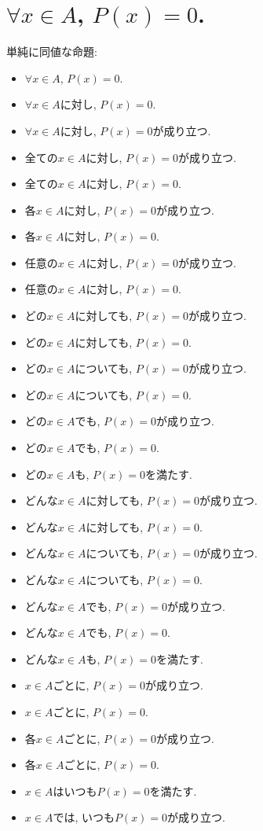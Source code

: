 \documentclass[a4paper,12pt,draft]{amsart}
\begin{document}
\section{$\forall x \in A$, $P(x)=0$.}
単純に同値な命題:
\begin{itemize}
\item $\forall x \in A$, $P(x)=0$.
\item $\forall x \in A$に対し, $P(x)=0$.
\item $\forall x \in A$に対し, $P(x)=0$が成り立つ.
\item 全ての$x\in A$に対し, $P(x)=0$が成り立つ.
\item 全ての$x\in A$に対し, $P(x)=0$.
\item 各$x\in A$に対し, $P(x)=0$が成り立つ.
\item 各$x\in A$に対し, $P(x)=0$.
\item 任意の$x\in A$に対し, $P(x)=0$が成り立つ.
\item 任意の$x\in A$に対し, $P(x)=0$.
\item どの$x\in A$に対しても, $P(x)=0$が成り立つ.
\item どの$x\in A$に対しても, $P(x)=0$.
\item どの$x\in A$についても, $P(x)=0$が成り立つ.
\item どの$x\in A$についても, $P(x)=0$.
\item どの$x\in A$でも, $P(x)=0$が成り立つ.
\item どの$x\in A$でも, $P(x)=0$.
\item どの$x\in A$も, $P(x)=0$を満たす.
\item どんな$x\in A$に対しても, $P(x)=0$が成り立つ.
\item どんな$x\in A$に対しても, $P(x)=0$.
\item どんな$x\in A$についても, $P(x)=0$が成り立つ.
\item どんな$x\in A$についても, $P(x)=0$.
\item どんな$x\in A$でも, $P(x)=0$が成り立つ.
\item どんな$x\in A$でも, $P(x)=0$.
\item どんな$x\in A$も, $P(x)=0$を満たす.
\item $x\in A$ごとに, $P(x)=0$が成り立つ.
\item $x\in A$ごとに, $P(x)=0$.
\item 各$x\in A$ごとに, $P(x)=0$が成り立つ.
\item 各$x\in A$ごとに, $P(x)=0$.
\item $x\in A$はいつも$P(x)=0$を満たす.
\item $x\in A$では, いつも$P(x)=0$が成り立つ.

\end{itemize}
\end{document}
